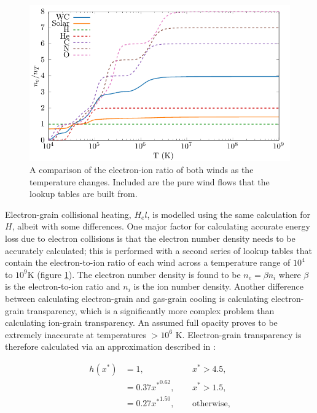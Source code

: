 \begin{figure}[h]
  \centering
  \includegraphics{assets/ionisation-fraction/ionisation-fraction.pdf}
  \caption[OB and WR electron-ion ratios]{A comparison of the electron-ion ratio of both winds as the temperature changes. Included are the pure wind flows that the lookup tables are built from.}
  \label{fig:electron-curve}
\end{figure}

Electron-grain collisional heating, $H_el$, is modelled using the same calculation for $H$, albeit with some differences.
One major factor for calculating accurate energy loss due to electron collisions is that the electron number density needs to be accurately calculated; this is performed with a second series of lookup tables that contain the electron-to-ion ratio of each wind across a temperature range of $10^4$ to $10^9\si{\kelvin}$ (figure \ref{fig:electron-curve}).
The electron number density is found to be $n_e = \beta n_i$ where $\beta$ is the electron-to-ion ratio and $n_i$ is the ion number density.
Another difference between calculating electron-grain and gas-grain cooling is calculating electron-grain transparency, which is a significantly more complex problem than calculating ion-grain transparency.
An assumed full opacity proves to be extremely inaccurate at temperatures $>10^6$ \si{\kelvin}.
Electron-grain transparency is therefore calculated via an approximation described in \textcite{dwek_infrared_1981}:

\begin{equation}
  \begin{alignedat}{3}
    h(x^*) & = 1 ,                && ~~ x^* > 4.5, \\
           & = 0.37{x^*}^{0.62} , && ~~ x^* > 1.5 , \\
           & = 0.27{x^*}^{1.50} , && ~~ \text{otherwise,}
  \end{alignedat}
\end{equation}

